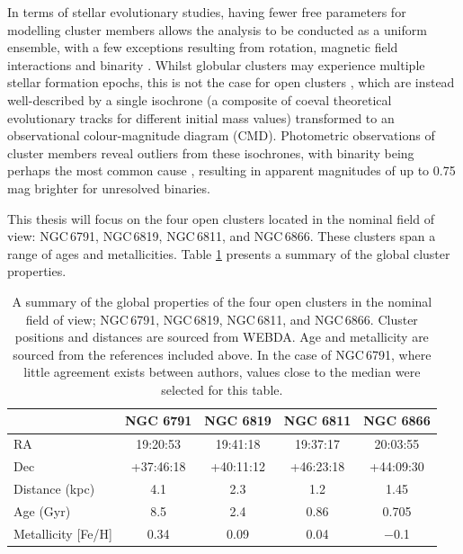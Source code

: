 In terms of stellar evolutionary studies, having fewer free parameters for modelling cluster members allows the analysis to be conducted as a uniform ensemble, with a few exceptions resulting from rotation, magnetic field interactions and binarity \citep{carroll_introduction_2006}. Whilst globular clusters may experience multiple stellar formation epochs, this is not the case for open clusters \citep{li_stellar_2016}, which are instead well-described by a single isochrone (a composite of coeval theoretical evolutionary tracks for different initial mass values) transformed to an observational colour-magnitude diagram (CMD). Photometric observations of cluster members reveal outliers from these isochrones, with binarity being perhaps the most common cause \citep[e.g.][]{duquennoy_multiplicity_1991, murphy_finding_2018}, resulting in apparent magnitudes of up to 0.75\,mag brighter for unresolved binaries.

This thesis will focus on the four open clusters located in the nominal \Kepler field of view: NGC\,6791, NGC\,6819, NGC\,6811, and NGC\,6866. These clusters span a range of ages and metallicities. Table \ref{tab:cluster_properties} presents a summary of the global cluster properties.

\begin{table}[h]
    \setlength\tabcolsep{10pt}
    \centering
    \begin{tabular}{lcccc}
        \hline
                        & NGC 6791 & NGC 6819 & NGC 6811 & NGC 6866 \\
        \hline
        \hline
        RA                      & 19:20:53 & 19:41:18 & 19:37:17 & 20:03:55 \\
        Dec                     & +37:46:18 & +40:11:12 & +46:23:18 & +44:09:30 \\
        Distance (kpc)          & 4.1 & 2.3 & 1.2 & 1.45 \\
        Age (Gyr)              & 8.5 & 2.4 & 0.86 & 0.705 \\
        Metallicity [Fe/H]      & 0.34 & 0.09 & 0.04 & $-$0.1\\
        \hline
        
    \end{tabular}
    \caption[A summary of the global properties of the four open clusters in the nominal \Kepler field of view]{A summary of the global properties of the four open clusters in the nominal \Kepler field of view; NGC\,6791, NGC\,6819, NGC\,6811, and NGC\,6866. Cluster positions and distances are sourced from WEBDA. Age and metallicity are sourced from the references included above. In the case of NGC\,6791, where little agreement exists between authors, values close to the median were selected for this table.}
    \label{tab:cluster_properties}
\end{table}

